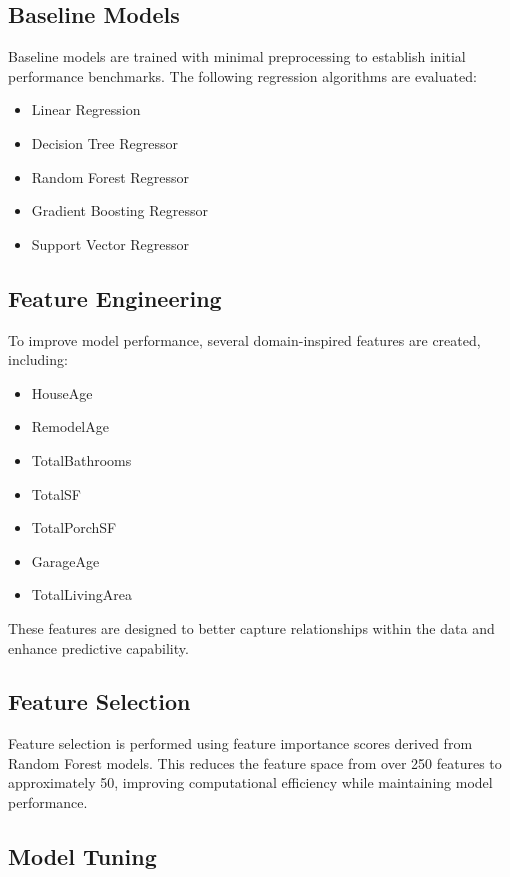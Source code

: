 \documentclass[conference]{IEEEtran}
\begin{document}
\subsection{Baseline Models}

Baseline models are trained with minimal preprocessing to establish initial performance benchmarks. The following regression algorithms are evaluated:

\begin{itemize}
\item Linear Regression
\item Decision Tree Regressor
\item Random Forest Regressor
\item Gradient Boosting Regressor
\item Support Vector Regressor
\end{itemize}

\subsection{Feature Engineering}

To improve model performance, several domain-inspired features are created, including:

\begin{itemize}
\item HouseAge
\item RemodelAge
\item TotalBathrooms
\item TotalSF
\item TotalPorchSF
\item GarageAge
\item TotalLivingArea
\end{itemize}

These features are designed to better capture relationships within the data and enhance predictive capability.

\subsection{Feature Selection}

Feature selection is performed using feature importance scores derived from Random Forest models. This reduces the feature space from over 250 features to approximately 50, improving computational efficiency while maintaining model performance.

\subsection{Model Tuning}
\end{document}
